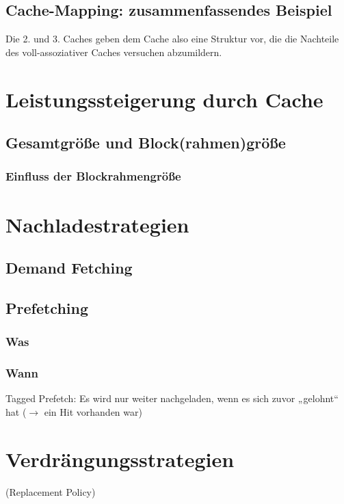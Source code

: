 \subsection{Cache-Mapping: zusammenfassendes Beispiel}
Die 2. und 3. Caches geben dem Cache also eine Struktur vor, die die Nachteile des voll-assoziativer Caches versuchen abzumildern.

\section{Leistungssteigerung durch Cache}


\subsection{Gesamtgröße und Block(rahmen)größe}
\subsubsection{Einfluss der Blockrahmengröße}

\section{Nachladestrategien}
\subsection{Demand Fetching}
\subsection{Prefetching}
\subsubsection*{Was}
\subsubsection*{Wann}
Tagged Prefetch: Es wird nur weiter nachgeladen, wenn es sich zuvor „gelohnt“ hat ($\to$ ein Hit vorhanden war)

\section{Verdrängungsstrategien}
(Replacement Policy)
